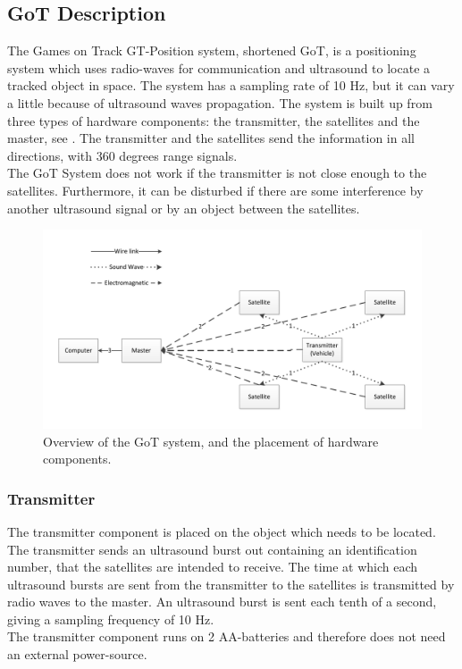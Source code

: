\subsection{GoT Description}
\label{GoTDescription}
The Games on Track GT-Position system, shortened GoT, is a positioning system which uses radio-waves for communication and ultrasound to locate a tracked object in space. The system has a sampling rate of 10 \si{Hz}, but it can vary a little because of ultrasound waves propagation. The system is built up from three types of hardware components: the transmitter, the satellites and the master, see . The transmitter and the satellites send the information in all directions, with 360 degrees range signals.\\
The GoT System does not work if the transmitter is not close enough to the satellites. Furthermore, it can be disturbed if there are some interference by another ultrasound signal or by an object between the satellites.
%
\begin{figure}[H]
	\centering
	\includegraphics[scale=0.7]{figures/GoT_description.pdf}
	\caption{Overview of the GoT system, and the placement of hardware components.}
	\label{GoTSystem}
\end{figure}\vspace{-5mm}
%
\subsubsection{Transmitter}
The transmitter component is placed on the object which needs to be located. The transmitter sends an ultrasound burst out containing an identification number, that the satellites are intended to receive. The time at which each ultrasound bursts are sent from the transmitter to the satellites is transmitted by radio waves to the master. An ultrasound burst is sent each tenth of a second, giving a sampling frequency of 10 Hz.\\ 
The transmitter component runs on 2 AA-batteries and therefore does not need an external power-source.
%
